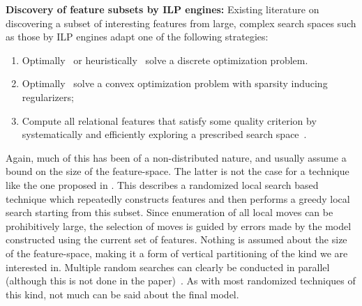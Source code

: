 \noindent \textbf{Discovery of feature subsets by ILP engines: }Existing literature on discovering a subset of interesting features from
large, complex search spaces such as those by ILP engines
adapt one of the following strategies:
\begin{enumerate}
 \item Optimally~\cite{l1Reg,cvpr2007,nips2004} or
    heuristically~\cite{JoshiRS08,Amrita12,Specia_09,RamakrishnanJBS07,SpeciaSRN06,NageshRCKDB12,ChalamallaNSR08}
    solve a discrete optimization problem.
\item Optimally~\cite{JawanpuriaNR11,NairSRK12} solve a convex
    optimization problem with sparsity inducing regularizers; 
 \item Compute all relational features that satisfy some quality criterion by
    systematically and efficiently exploring a prescribed
    search space~\cite{pei2004,subseqGap2006,bitSpade,antunes2003,han2005,rakesh1995,han2004,gehrke2002,rastogi1999,davis2005integrated,Davis05b,Landwehr:2007,Davis:2007,Dzeroski:1993}.
\end{enumerate}

\noindent
Again, much of this has been of a non-distributed nature, and
usually assume a bound on the size of the feature-space. The latter
is not the case for a technique like the one proposed in
\cite{JoshiRS08}. This describes a randomized local search based
technique which repeatedly constructs features
and then performs a greedy local search starting from this
subset. Since enumeration of all local moves can be prohibitively large,
the selection of moves is guided by errors made by the model constructed
using the current set of features. Nothing is assumed about the size
of the feature-space, making it a form of vertical partitioning of the kind
we are interested in.
Multiple random searches can clearly be
conducted in parallel (although this is not done in the paper)~\cite{Filip_06a,Fonseca:2005}. As with
most randomized techniques of this kind, not much can be said about the
final model.
    
